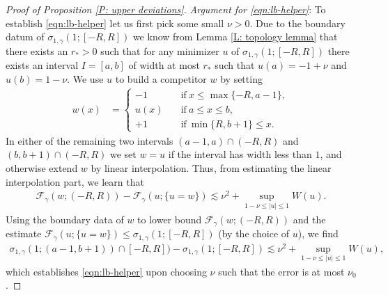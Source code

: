 \documentclass[12pt]{amsart}
\begin{document}
\begin{proof}[Proof of Proposition \ref{P: upper deviations}]
			\textit{Argument for \eqref{eqn:lb-helper}}: To establish \eqref{eqn:lb-helper} let us first pick some small $ \nu > 0 $. Due to the boundary datum of $  \sigma_{ 1 , \gamma } ( 1;  [ - R , R ] ) $ we know from Lemma \ref{L: topology lemma} that there exists an $ r_{*} > 0 $ such that for any minimizer $ u $ of $  \sigma_{ 1 , \gamma } ( 1; [ - R , R ] ) $ there exists an interval $ I = [ a, b ] $ of width at most $r_{*}$ such that $ u ( a ) = - 1 + \nu $ and $ u ( b )= 1 - \nu $. We use $ u $ to build a competitor $ w $ by setting
			\begin{align*}
				w ( x ) &= \left\{ \begin{aligned}
					- 1 \quad & \text{if} ~ x \leq \max \{ -R , a - 1 \} , \\
					u ( x ) \quad & \text{if} ~ a \leq x \leq b , \\
					+1 \quad & \text{if} ~ \min \{ R, b + 1 \}  \leq x .
				\end{aligned}\right.
			\end{align*}
			In either of the remaining two intervals $  ( a - 1 , a ) \cap ( - R , R )  $ and $ ( b , b + 1 ) \cap ( - R , R ) $ we set $ w = u $ if the interval has width less than $1$, and otherwise extend $ w $ by linear interpolation. Thus, from estimating the linear interpolation part, we learn that
			\begin{align*}
				\mathscr{F}_{ \gamma } ( w ; ( - R , R ) )
				- \mathscr{F}_{ \gamma } ( u ; \{ u = w \} )
				\lesssim \nu^2 +  \sup_{ 1 - \nu \leq | u | \leq 1 } W ( u ) .
			\end{align*}
			Using the boundary data of  $ w $ to lower bound $ \mathscr{F}_{ \gamma } ( w ; ( - R , R ) ) $ and the estimate $  \mathscr{F}_{ \gamma } ( u ; \{ u = w \} ) \leq \sigma_{ 1 , \gamma } ( 1 ; [ - R , R ] ) $ (by the choice of $ u $), we find
			\begin{align*}
				 \sigma_{ 1 , \gamma } ( 1; ( a - 1 , b + 1 ) ) \cap [ -R , R ] ) 
				 -  \sigma_{ 1 , \gamma } ( 1; [ - R , R ] )
				 \lesssim \nu^2 +  \sup_{ 1 - \nu \leq | u | \leq 1 } W ( u ) ,
			\end{align*}
			which establishes \eqref{eqn:lb-helper} upon choosing $ \nu $ such that the error is at most $ \nu_{0} $.
			

\end{proof}
\end{document}
